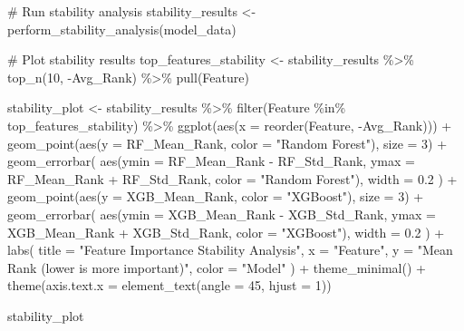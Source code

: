 \documentclass[
  letterpaper,
  DIV=11,
  numbers=noendperiod]{scrreprt}
\newenvironment{Shaded}{\begin{snugshade}}{\end{snugshade}}
\newcommand{\AttributeTok}[1]{\textcolor[rgb]{0.40,0.45,0.13}{#1}}
\newcommand{\CommentTok}[1]{\textcolor[rgb]{0.37,0.37,0.37}{#1}}
\newcommand{\DecValTok}[1]{\textcolor[rgb]{0.68,0.00,0.00}{#1}}
\newcommand{\FloatTok}[1]{\textcolor[rgb]{0.68,0.00,0.00}{#1}}
\newcommand{\FunctionTok}[1]{\textcolor[rgb]{0.28,0.35,0.67}{#1}}
\newcommand{\NormalTok}[1]{\textcolor[rgb]{0.00,0.23,0.31}{#1}}
\newcommand{\OtherTok}[1]{\textcolor[rgb]{0.00,0.23,0.31}{#1}}
\newcommand{\SpecialCharTok}[1]{\textcolor[rgb]{0.37,0.37,0.37}{#1}}
\newcommand{\StringTok}[1]{\textcolor[rgb]{0.13,0.47,0.30}{#1}}
\begin{document}
\begin{Shaded}
\begin{Highlighting}[]
\CommentTok{\# Run stability analysis}
\NormalTok{stability\_results }\OtherTok{\textless{}{-}} \FunctionTok{perform\_stability\_analysis}\NormalTok{(model\_data)}

\CommentTok{\# Plot stability results}
\NormalTok{top\_features\_stability }\OtherTok{\textless{}{-}}\NormalTok{ stability\_results }\SpecialCharTok{\%\textgreater{}\%}
  \FunctionTok{top\_n}\NormalTok{(}\DecValTok{10}\NormalTok{, }\SpecialCharTok{{-}}\NormalTok{Avg\_Rank) }\SpecialCharTok{\%\textgreater{}\%}
  \FunctionTok{pull}\NormalTok{(Feature)}

\NormalTok{stability\_plot }\OtherTok{\textless{}{-}}\NormalTok{ stability\_results }\SpecialCharTok{\%\textgreater{}\%}
  \FunctionTok{filter}\NormalTok{(Feature }\SpecialCharTok{\%in\%}\NormalTok{ top\_features\_stability) }\SpecialCharTok{\%\textgreater{}\%}
  \FunctionTok{ggplot}\NormalTok{(}\FunctionTok{aes}\NormalTok{(}\AttributeTok{x =} \FunctionTok{reorder}\NormalTok{(Feature, }\SpecialCharTok{{-}}\NormalTok{Avg\_Rank))) }\SpecialCharTok{+}
  \FunctionTok{geom\_point}\NormalTok{(}\FunctionTok{aes}\NormalTok{(}\AttributeTok{y =}\NormalTok{ RF\_Mean\_Rank, }\AttributeTok{color =} \StringTok{"Random Forest"}\NormalTok{), }\AttributeTok{size =} \DecValTok{3}\NormalTok{) }\SpecialCharTok{+}
  \FunctionTok{geom\_errorbar}\NormalTok{(}
    \FunctionTok{aes}\NormalTok{(}\AttributeTok{ymin =}\NormalTok{ RF\_Mean\_Rank }\SpecialCharTok{{-}}\NormalTok{ RF\_Std\_Rank, }\AttributeTok{ymax =}\NormalTok{ RF\_Mean\_Rank }\SpecialCharTok{+}\NormalTok{ RF\_Std\_Rank, }\AttributeTok{color =} \StringTok{"Random Forest"}\NormalTok{),}
    \AttributeTok{width =} \FloatTok{0.2}
\NormalTok{  ) }\SpecialCharTok{+}
  \FunctionTok{geom\_point}\NormalTok{(}\FunctionTok{aes}\NormalTok{(}\AttributeTok{y =}\NormalTok{ XGB\_Mean\_Rank, }\AttributeTok{color =} \StringTok{"XGBoost"}\NormalTok{), }\AttributeTok{size =} \DecValTok{3}\NormalTok{) }\SpecialCharTok{+}
  \FunctionTok{geom\_errorbar}\NormalTok{(}
    \FunctionTok{aes}\NormalTok{(}\AttributeTok{ymin =}\NormalTok{ XGB\_Mean\_Rank }\SpecialCharTok{{-}}\NormalTok{ XGB\_Std\_Rank, }\AttributeTok{ymax =}\NormalTok{ XGB\_Mean\_Rank }\SpecialCharTok{+}\NormalTok{ XGB\_Std\_Rank, }\AttributeTok{color =} \StringTok{"XGBoost"}\NormalTok{),}
    \AttributeTok{width =} \FloatTok{0.2}
\NormalTok{  ) }\SpecialCharTok{+}
  \FunctionTok{labs}\NormalTok{(}
    \AttributeTok{title =} \StringTok{"Feature Importance Stability Analysis"}\NormalTok{,}
    \AttributeTok{x =} \StringTok{"Feature"}\NormalTok{,}
    \AttributeTok{y =} \StringTok{"Mean Rank (lower is more important)"}\NormalTok{,}
    \AttributeTok{color =} \StringTok{"Model"}
\NormalTok{  ) }\SpecialCharTok{+}
  \FunctionTok{theme\_minimal}\NormalTok{() }\SpecialCharTok{+}
  \FunctionTok{theme}\NormalTok{(}\AttributeTok{axis.text.x =} \FunctionTok{element\_text}\NormalTok{(}\AttributeTok{angle =} \DecValTok{45}\NormalTok{, }\AttributeTok{hjust =} \DecValTok{1}\NormalTok{))}

\NormalTok{stability\_plot}
\end{Highlighting}
\end{Shaded}
\end{document}
